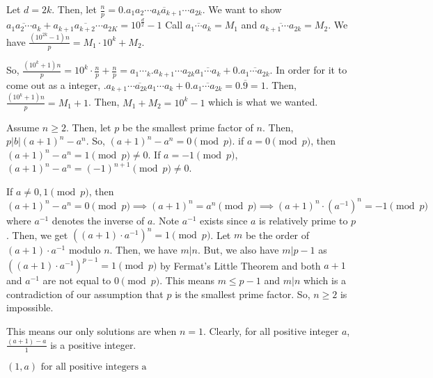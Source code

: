 \documentclass[11pt]{article}
\begin{document}
\begin{sol}[2]
Let $d=2k$. Then, let $\frac{n}{p}=0.\overline{a_{1}a_{2}\cdots a_{k}a_{k+1}\cdots a_{2k}}$. We want to show $\overline{a_{1}a_{2}\cdots a_{k}} + \overline{a_{k+1}a_{k+2}\cdots a_{2K}} = 10^{\frac{d}{2}}-1$ Call $\overline{a_{1}\cdots a_{k}}=M_{1}$ and $\overline{a_{k+1}\cdots a_{2k}}=M_{2}$. We have $\frac{(10^{2k}-1)n}{p}=M_{1}\cdot 10^{k}+M_{2}$.

So, $\frac{(10^{k}+1)n}{p}=10^{k}\cdot \frac{n}{p}+\frac{n}{p}=a_{1}\cdots_{k}.a_{k+1}\cdots a_{2k}\overline{a_{1}\cdots a_{k}} + 0.\overline{a_{1}\cdots a_{2k}}$. In order for it to come out as a integer, $.\overline{a_{k+1}\cdots a_{2k}a_{1}\cdots a_{k}}+0.\overline{a_{1}\cdots a_{2k}}=0.\overline{9}=1$.  Then, $\frac{(10^{k}+1)n}{p}=M_{1}+1$.  Then, $M_{1}+M_{2}=10^{k}-1$ which is what we wanted.
\end{sol}


\begin{sol}
Assume $n\ge 2$. Then, let $p$ be the smallest prime factor of $n$. Then, $p|b|(a+1)^{n}-a^{n}$. So, $(a+1)^{n}-a^{n}=0\pmod{p}$. if $a=0\pmod{p}$, then $(a+1)^{n}-a^{n}=1\pmod{p}\neq 0$. If $a=-1\pmod{p}$, $(a+1)^{n}-a^{n}=(-1)^{n+1}\pmod{p}\neq 0$.

 If $a\neq 0,1\pmod{p}$, then $(a+1)^{n}-a^{n}=0\pmod{p}\implies (a+1)^{n}=a^{n}\pmod{p}\implies (a+1)^{n}\cdot (a^{-1})^{n}=-1\pmod{p}$ where $a^{-1}$ denotes the inverse of $a$. Note $a^{-1}$ exists since $a$ is relatively prime to $p$. Then, we get $((a+1)\cdot a^{-1})^{n}=1\pmod{p}$. Let $m$ be the order of $(a+1)\cdot a^{-1}$ modulo $n$. Then, we have $m|n$. But, we also have $m|p-1$ as $((a+1)\cdot a^{-1})^{p-1}=1\pmod{p}$ by Fermat\rq{s} Little Theorem and both $a+1$ and $a^{-1}$ are not equal to $0\pmod{p}$.  This means $m\leq p-1$ and $m|n$ which is a contradiction of our assumption that $p$ is the smallest prime factor. So, $n\ge 2$ is impossible.
 
 This means our only solutions are when $n=1$. Clearly, for all positive integer $a$, $\frac{(a+1)-a}{1}$ is a positive integer.
 
 $\boxed{(1,a) \text{ for all positive integers a}}$
\end{sol}
\end{document}

